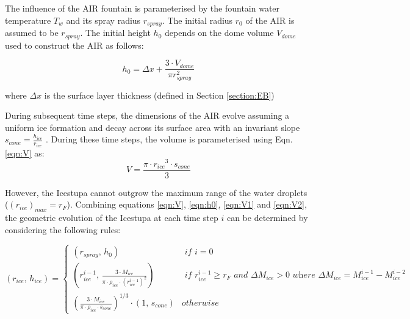 \documentclass[utf8]{frontiersSCNS} %
\begin{document}
The influence of the AIR fountain is parameterised by the fountain water temperature $T_{w}$ and its spray radius $r_{spray}$.
The initial radius $r_0$ of the AIR is assumed to be $r_{spray}$. The initial height $h_0$ depends on the dome volume
$V_{dome}$ used to construct the AIR as follows:

\begin{equation} 
    h_{0} =  \Delta x + \frac{3 \cdot V_{dome}}{\pi r_{spray}^2 } 
\label{eqn:h0}
  \end{equation}

where $\Delta x$ is the surface layer thickness (defined in Section \ref{section:EB})

During subsequent time steps, the dimensions of the AIR evolve assuming a uniform ice formation and decay across
its surface area with an invariant slope $s_{cone} = \frac{h_{ice}}{r_{ice}}$ .  During
these time steps, the volume is parameterised using Eqn. \ref{eqn:V} as:\begin{equation} V = \frac{\pi \cdot {r_{ice}}^3
    \cdot s_{cone}}{3} \label{eqn:V2} \end{equation} 


However, the Icestupa cannot outgrow the maximum range of the water droplets ($(r_{ice})_{max} = r_{F}$). Combining
equations \ref{eqn:V}, \ref{eqn:h0}, \ref{eqn:V1} and \ref{eqn:V2}, the geometric evolution of the Icestupa at each time step $i$ can
be determined by considering the following rules:

\begin{equation} (r_{ice},\, h_{ice}) = \left\{ \begin{array}{ll} (r_{spray} ,\, h_0) & \textit{ if } i=0\\
    (r_{ice}^{i-1},\, \frac{3 \cdot M_{ice}}{\pi \cdot \rho_{ice} \cdot {(r_{ice}^{i-1})}^2}) & \textit{ if }
    r_{ice}^{i-1} \geq r_{F} \textit{ and } \Delta M_{ice} > 0 \textit{ where } \Delta M_{ice} = M_{ice}^{i-1} -
    M_{ice}^{i-2}\\ (\frac{3 \cdot M_{ice}}{\pi \cdot \rho_{ice} \cdot s_{cone}})^{1/3} \cdot (1,\,  s_{cone}) &
otherwise \end{array} \right.  \label{eqn:A2} \end{equation}
\end{document}
